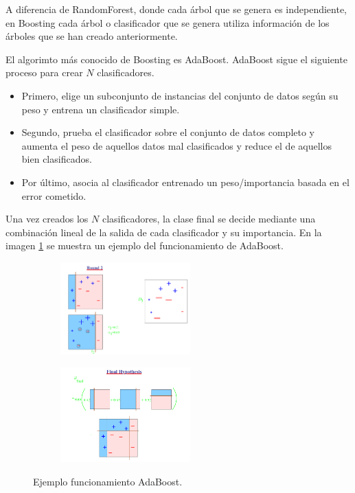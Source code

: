 A diferencia de RandomForest, donde cada árbol que se genera es independiente, en Boosting cada árbol o clasificador que se genera utiliza información de los árboles que se han creado anteriormente.\newline

El algorimto más conocido de Boosting es AdaBoost. AdaBoost sigue el siguiente proceso para crear $N$ clasificadores. 
\begin{itemize}
	\item Primero, elige un subconjunto de instancias del conjunto de datos según su peso y entrena un clasificador simple.
	\item Segundo, prueba el clasificador sobre el conjunto de datos completo y aumenta el peso de aquellos datos mal clasificados y reduce el de aquellos bien clasificados.
	\item Por último, asocia al clasificador entrenado un peso/importancia basada en el error cometido.
\end{itemize}
\verticalspace

Una vez creados los $N$ clasificadores, la clase final se decide mediante una combinación lineal de la salida de cada clasificador y su importancia. En la imagen \ref{fig:217} se muestra un ejemplo del funcionamiento de AdaBoost.\newline

\begin{figure}[H]
	\centering
	\begin{subfigure}{.4\textwidth}
		\centering
		\includegraphics[width=50mm]{imagenes/boosting_2.png}
	\end{subfigure}
	\hspace{0.01in}
	\begin{subfigure}{.4\textwidth}
		\centering
		\includegraphics[width=50mm]{imagenes/boosting_final.png}
	\end{subfigure}
	\caption{Ejemplo funcionamiento AdaBoost.}
	\label{fig:217}
\end{figure}
\verticalspace

